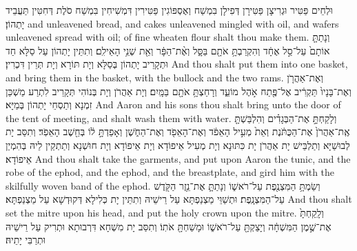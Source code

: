 {{וּלְחֵים פַּטִּיר וּגְרִיצָן פַּטִּירָן דְּפִילָן בִּמְשַׁח וְאֶסְפּוֹגִין פַּטִּירִין דִּמְשִׁיחִין בִּמְשַׁח סֹלֶת דְּחִטִּין תַּעֲבֵיד יָתְהוֹן׃}
{and unleavened bread, and cakes unleavened mingled with oil, and wafers unleavened spread with oil; of fine wheaten flour shalt thou make them.}{}
{וְנָתַתָּ֤ אוֹתָם֙ עַל־סַ֣ל אֶחָ֔ד וְהִקְרַבְתָּ֥ אֹתָ֖ם בַּסָּ֑ל וְאֶ֨ת־הַפָּ֔ר וְאֵ֖ת שְׁנֵ֥י הָאֵילִֽם׃
}
{וְתִתֵּין יָתְהוֹן עַל סַלָּא חַד וּתְקָרֵיב יָתְהוֹן בְּסַלָּא וְיָת תּוֹרָא וְיָת תְּרֵין דִּכְרִין׃}
{And thou shalt put them into one basket, and bring them in the basket, with the bullock and the two rams.}{}
{וְאֶת־אַהֲרֹ֤ן וְאֶת־בָּנָיו֙ תַּקְרִ֔יב אֶל־פֶּ֖תַח אֹ֣הֶל מוֹעֵ֑ד וְרָחַצְתָּ֥ אֹתָ֖ם בַּמָּֽיִם׃
}
{וְיָת אַהֲרֹן וְיָת בְּנוֹהִי תְּקָרֵיב לִתְרַע מַשְׁכַּן זִמְנָא וְתַסְחֵי יָתְהוֹן בְּמַיָּא׃}
{And Aaron and his sons thou shalt bring unto the door of the tent of meeting, and shalt wash them with water.}{}
{וְלָקַחְתָּ֣ אֶת־הַבְּגָדִ֗ים וְהִלְבַּשְׁתָּ֤ אֶֽת־אַהֲרֹן֙ אֶת־הַכֻּתֹּ֔נֶת וְאֵת֙ מְעִ֣יל הָאֵפֹ֔ד וְאֶת־הָאֵפֹ֖ד וְאֶת־הַחֹ֑שֶׁן וְאָפַדְתָּ֣ ל֔וֹ בְּחֵ֖שֶׁב הָאֵפֹֽד׃
}
{וְתִסַּב יָת לְבוּשַׁיָּא וְתַלְבֵּישׁ יָת אַהֲרֹן יָת כִּתּוּנָא וְיָת מְעִיל אֵיפוֹדָא וְיָת אֵיפוֹדָא וְיָת חוּשְׁנָא וְתַתְקֵין לֵיהּ בְּהִמְיַן אֵיפוֹדָא׃}
{And thou shalt take the garments, and put upon Aaron the tunic, and the robe of the ephod, and the ephod, and the breastplate, and gird him with the skilfully woven band of the ephod.}{}
{וְשַׂמְתָּ֥ הַמִּצְנֶ֖פֶת עַל־רֹאשׁ֑וֹ וְנָתַתָּ֛ אֶת־נֵ֥זֶר הַקֹּ֖דֶשׁ עַל־הַמִּצְנָֽפֶת׃
}
{וּתְשַׁוֵּי מַצְנַפְתָּא עַל רֵישֵׁיהּ וְתִתֵּין יָת כְּלִילָא דְּקוּדְשָׁא עַל מַצְנַפְתָּא׃}
{And thou shalt set the mitre upon his head, and put the holy crown upon the mitre.}{}
{וְלָֽקַחְתָּ֙ אֶת־שֶׁ֣מֶן הַמִּשְׁחָ֔ה וְיָצַקְתָּ֖ עַל־רֹאשׁ֑וֹ וּמָשַׁחְתָּ֖ אֹתֽוֹ׃
}
{וְתִסַּב יָת מִשְׁחָא דִּרְבוּתָא וּתְרִיק עַל רֵישֵׁיהּ וּתְרַבִּי יָתֵיהּ׃}
}
